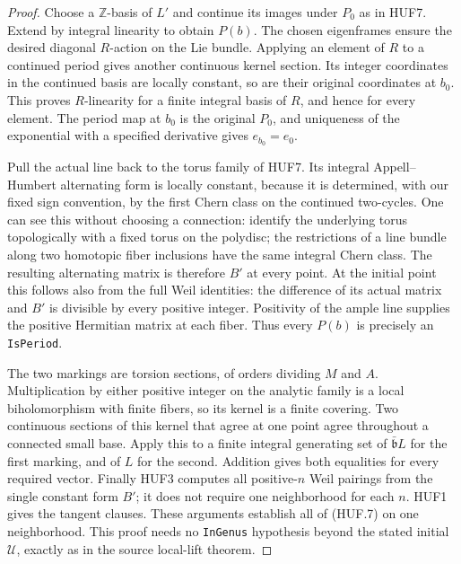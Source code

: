 \begin{proof}
Choose a \(\mathbb Z\)-basis of \(L'\) and continue its
images under \(P_0\) as in HUF7.  Extend by integral
linearity to obtain \(P(b)\).  The chosen eigenframes
ensure the desired diagonal \(R\)-action on the Lie
bundle.  Applying an element of \(R\) to a continued
period gives another continuous kernel section.  Its
integer coordinates in the continued basis are locally
constant, so are their original coordinates at \(b_0\).
This proves \(R\)-linearity for a finite integral basis
of \(R\), and hence for every element.  The period map
at \(b_0\) is the original \(P_0\), and uniqueness of
the exponential with a specified derivative gives
\(e_{b_0}=e_0\).

Pull the actual line back to the torus family of HUF7.
Its integral Appell--Humbert alternating form is locally
constant, because it is determined, with our fixed sign
convention, by the first Chern class on the continued
two-cycles.  One can see this
without choosing a connection: identify the underlying
torus topologically with a fixed torus on the polydisc;
the restrictions of a line bundle along two homotopic
fiber inclusions have the same integral Chern class.
The resulting alternating matrix is therefore \(B'\)
at every point.  At the initial point this follows
also from the full Weil identities: the difference
of its actual matrix and \(B'\) is divisible by
every positive integer.  Positivity of the ample line
supplies the positive Hermitian matrix at each fiber.
Thus every \(P(b)\) is precisely an \texttt{IsPeriod}.

The two markings are torsion sections, of orders dividing
\(M\) and \(A\).  Multiplication by either positive
integer on the analytic family is a local biholomorphism
with finite fibers, so its kernel is a finite covering.
Two continuous sections of this kernel that agree at
one point agree throughout a connected small base.
Apply this to a finite integral generating set of
\(\bar{\mathfrak b}L\) for the first marking, and of
\(L\) for the second.  Addition gives both equalities
for every required vector.  Finally HUF3 computes
all positive-\(n\) Weil pairings from the single
constant form \(B'\); it does not require one
neighborhood for each \(n\).  HUF1 gives the tangent
clauses.  These arguments establish all of (HUF.7)
on one neighborhood.  This proof needs no
\texttt{InGenus} hypothesis beyond the stated initial
\(\mathcal U\), exactly as in the source local-lift
theorem.
\end{proof}

